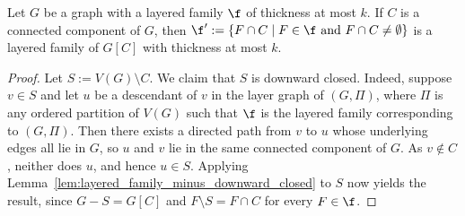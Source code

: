\begin{lemma}\label{lem:layered_family_restricted_to_component}
    Let $G$ be a graph with a layered family $\f$ of thickness at most $k$. If $C$ is a connected component of $G$, then $\f' := \{F \cap C \mid F \in \f \text{ and } F\cap C \neq \emptyset\}$ is a layered family of $G[C]$ with thickness at most $k$.
\end{lemma}
\begin{proof}
    Let $S := V(G)\setminus C$. We claim that $S$ is downward closed. Indeed, suppose $v\in S$ and let $u$ be a descendant of $v$ in the layer graph of $(G,\Pi)$, where $\Pi$ is any ordered partition of $V(G)$ such that $\f$ is the layered family corresponding to $(G,\Pi)$. Then there exists a directed path from $v$ to $u$ whose underlying edges all lie in $G$, so $u$ and $v$ lie in the same connected component of $G$. As $v\notin C$, neither does $u$, and hence $u\in S$.
    Applying Lemma~\ref{lem:layered_family_minus_downward_closed} to $S$ now yields the result, since $G - S = G[C]$ and $F\setminus S = F\cap C$ for every $F\in\f$.
\end{proof}


